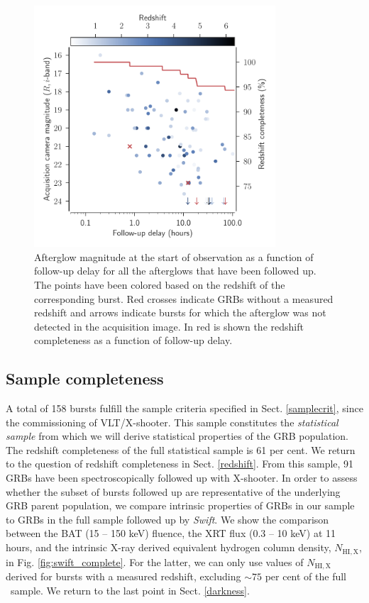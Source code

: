 \documentclass{aa}    %
\begin{document}
\begin{figure}
	\centerline{\includegraphics[width=9cm]{figures/timing.pdf}} \caption{Afterglow
	magnitude at the start of observation as a function of follow-up delay for all
	the afterglows that have been followed up. The points have been colored based
	on the redshift of the corresponding burst. Red crosses indicate GRBs without a
	measured redshift and arrows indicate bursts for which the afterglow was not
	detected in the acquisition image. In red is shown the redshift completeness as
	a function of follow-up delay.} \label{fig:timing}
\end{figure}
\subsection{Sample completeness} \label{completeness}

A total of 158 bursts fulfill the sample criteria specified in Sect.
\ref{samplecrit},  since the commissioning of VLT/X-shooter. This sample
constitutes the \textit{statistical sample} from which we will derive
statistical properties of the GRB population. The redshift completeness of the
full statistical sample is 61 per cent. We return to the question of redshift
completeness in Sect. \ref{redshift}. From this sample, 91 GRBs have been
spectroscopically followed up with X-shooter. In order to assess whether the
subset of bursts followed up are representative of the underlying GRB parent
population, we compare intrinsic properties of GRBs in our sample to GRBs in the
full sample followed up by \textit{Swift}. We show the comparison between the
BAT (15 -- 150 keV) fluence, the XRT flux (0.3 -- 10 keV) at 11 hours, and the
intrinsic X-ray derived equivalent hydrogen column density, $N_{\mathrm{HI,X}}$,
in Fig. \ref{fig:swift_complete}. For the latter, we can only use values of
$N_{\mathrm{HI,X}}$ derived for bursts with a measured redshift, excluding $\sim
75$ per cent of the full \swift~sample. We return to the last point in Sect.
\ref{darkness}.
\end{document}
